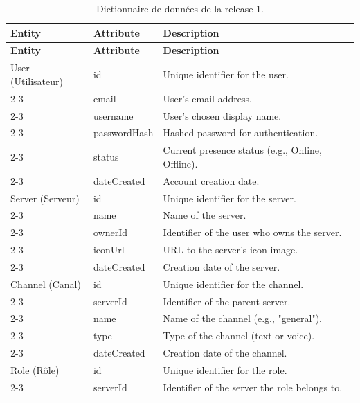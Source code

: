 \renewcommand{\arraystretch}{1.5}
\begin{longtable}{| p{4cm} | p{3.5cm} | p{7cm} |}
    \hline
    \rowcolor{lightgray}
    \textbf{Entity} & \textbf{Attribute} & \textbf{Description} \\
    \hline
    \endfirsthead
    \hline
    \rowcolor{lightgray}
    \textbf{Entity} & \textbf{Attribute} & \textbf{Description} \\
    \hline
    \endhead
    \hline
    \endfoot
    \hline
    \caption{Dictionnaire de données de la release 1.}
    \label{tab:data_dictionary_r1}
    \endlastfoot

    User (Utilisateur) & id & Unique identifier for the user. \\
    \cline{2-3}
         & email & User's email address. \\
    \cline{2-3}
         & username & User's chosen display name. \\
    \cline{2-3}
         & passwordHash & Hashed password for authentication. \\
    \cline{2-3}
         & status & Current presence status (e.g., Online, Offline). \\
    \cline{2-3}
         & dateCreated & Account creation date. \\
    \hline
    Server (Serveur) & id & Unique identifier for the server. \\
    \cline{2-3}
         & name & Name of the server. \\
    \cline{2-3}
         & ownerId & Identifier of the user who owns the server. \\
    \cline{2-3}
         & iconUrl & URL to the server's icon image. \\
    \cline{2-3}
         & dateCreated & Creation date of the server. \\
    \hline
    Channel (Canal) & id & Unique identifier for the channel. \\
    \cline{2-3}
         & serverId & Identifier of the parent server. \\
    \cline{2-3}
         & name & Name of the channel (e.g., "general"). \\
    \cline{2-3}
         & type & Type of the channel (text or voice). \\
    \cline{2-3}
         & dateCreated & Creation date of the channel. \\
    \hline
    Role (Rôle) & id & Unique identifier for the role. \\
    \cline{2-3}
         & serverId & Identifier of the server the role belongs to. \\

\end{longtable}
